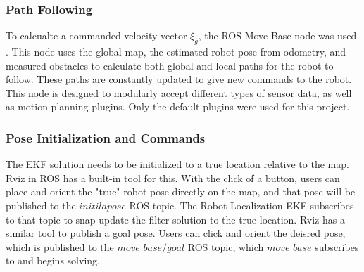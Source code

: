 \subsubsection{ Path Following }

To calcualte a commanded velocity vector $\xi_g$, the ROS Move Base node was used \cite{movebase}. This node uses the global map, the estimated robot pose from odometry, and measured obstacles to calculate both global and local paths for the robot to follow. These paths are constantly updated to give new commands to the robot. This node is designed to modularly accept different types of sensor data, as well as motion planning plugins. Only the default plugins were used for this project.

\subsubsection{ Pose Initialization and Commands }

The EKF solution needs to be initialized to a true location relative to the map. Rviz in ROS \cite{rviz} has a built-in tool for this. With the click of a button, users can place and orient the "true" robot pose directly on the map, and that pose will be published to the $initilapose$ ROS topic. The Robot Localization EKF subscribes to that topic to snap update the filter solution to the true location. Rviz has a similar tool to publish a goal pose. Users can click and orient the deisred pose, which is published to the $move\_base/goal$ ROS topic, which $move\_base$ subscribes to and begins solving. 
